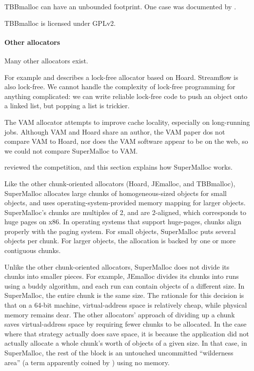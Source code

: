 \documentclass[pldi]{sigplanconf-pldi15}
\begin{document}
TBBmalloc can have an unbounded footprint.  One case was documented by
\cite{Vyukov08}.

TBBmalloc is licensed under GPLv2.

{\paragraph{Other allocators}} Many other allocators exist. 

For example \cite{Michael04} and describes a lock-free allocator based
on Hoard.  Streamflow \cite{SchneiderAnNi06} is also lock-free.  We
cannot handle the complexity of lock-free programming for anything
complicated: we can write reliable lock-free code to push an object
onto a linked list, but popping a list is trickier.

The VAM allocator \cite{FengBe05} attempts to improve cache locality,
especially on long-running jobs.  Although VAM and Hoard share an
author, the VAM paper dos not compare VAM to Hoard, nor does the VAM
software appear to be on the web, so we could not compare SuperMalloc
to VAM\@.


 reviewed the competition, and this section explains how
SuperMalloc works.   

Like the other chunk-oriented allocators (Hoard, JEmalloc, and
TBBmalloc), SuperMalloc allocates large chunks of homogeneous-sized
objects for small objects, and uses operating-system-provided memory
mapping for larger objects.  SuperMalloc's chunks are multiples of
\unit{2}\mebi\byte, and are \unit{2}\mebi\byte{}-aligned, which
corresponds to huge pages on x86.  In operating systems that support
huge-pages, chunks align properly with the paging system.  For small
objects, SuperMalloc puts several objects per chunk.  For larger
objects, the allocation is backed by one or more contiguous chunks.

Unlike the other chunk-oriented allocators, SuperMalloc does not
divide its chunks into smaller pieces.  For example, JEmalloc divides
its chunks into runs using a buddy algorithm, and each run can contain
objects of a different size.  In SuperMalloc, the entire chunk is the
same size.  The rationale for this decision is that on a 64-bit
machine, virtual-address space is relatively cheap, while physical
memory remains dear.  The other allocators' approach of dividing up a
chunk saves virtual-address space by requiring fewer chunks to be
allocated.  In the case where that strategy actually does save space,
it is because the application did not actually allocate a whole
chunk's worth of objects of a given size.  In that case, in
SuperMalloc, the rest of the block is an untouched uncommitted
``wilderness area'' (a term apparently coined by \cite{KornVo85})
using no memory.
\end{document}
